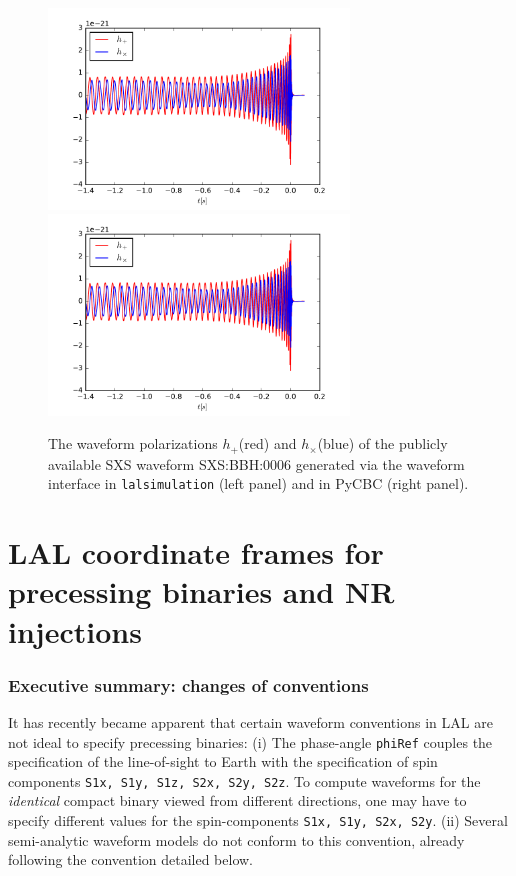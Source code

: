 \documentclass[11pt,tightenlines,article,amssymb,amsmath,amsfonts,superscriptaddress,nofootinbib]{revtex4}
\begin{document}
\begin{figure}
\begin{center}
\includegraphics[width=80mm]{lalsim_SXS6.pdf}
\includegraphics[width=80mm]{pycbc_SXS6.pdf}
\caption{The waveform polarizations $h_+$(red) and $h_\times$(blue) of the publicly available SXS waveform SXS:BBH:0006
generated via the waveform interface in \texttt{lalsimulation} (left panel) and in PyCBC (right panel). }
\label{fig:waveforms}
\end{center}
\end{figure}

\section{LAL coordinate frames for precessing binaries and NR injections}
\label{sec:coordinates}

\subsubsection{Executive summary: changes of conventions}

It has recently became apparent that certain waveform conventions in LAL
are not ideal to specify precessing binaries: (i) The
phase-angle {\tt phiRef} couples the specification of the line-of-sight to
Earth with the specification of spin components {\tt S1x, S1y, S1z, S2x,
S2y, S2z}. To compute waveforms for the \emph{identical} compact binary
viewed from different directions, one may have to specify different
values for the spin-components {\tt S1x, S1y, S2x, S2y}.
(ii) Several semi-analytic waveform models do not conform to this 
convention, already following the convention detailed below.
\end{document}
